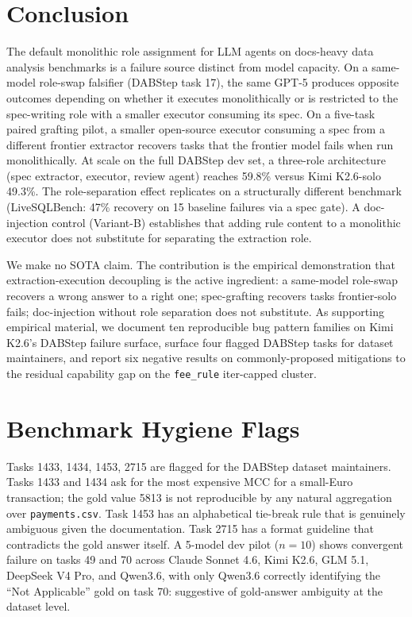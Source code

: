 \documentclass[conference]{IEEEtran}
\newcommand{\Kimi}{Kimi K2.6}
\newcommand{\DeepSeek}{DeepSeek V4 Pro}
\newcommand{\Sonnet}{Claude Sonnet 4.6}
\begin{document}
\section{Conclusion}
\label{sec:conclusion}

The default monolithic role assignment for LLM agents on docs-heavy data analysis benchmarks is a failure source distinct from model capacity. On a same-model role-swap falsifier (DABStep task 17), the same GPT-5 produces opposite outcomes depending on whether it executes monolithically or is restricted to the spec-writing role with a smaller executor consuming its spec. On a five-task paired grafting pilot, a smaller open-source executor consuming a spec from a different frontier extractor recovers tasks that the frontier model fails when run monolithically. At scale on the full DABStep dev set, a three-role architecture (spec extractor, executor, review agent) reaches 59.8\% versus \Kimi{}-solo 49.3\%. The role-separation effect replicates on a structurally different benchmark (LiveSQLBench: 47\% recovery on 15 baseline failures via a spec gate). A doc-injection control (Variant-B) establishes that adding rule content to a monolithic executor does not substitute for separating the extraction role.

We make no SOTA claim. The contribution is the empirical demonstration that extraction-execution decoupling is the active ingredient: a same-model role-swap recovers a wrong answer to a right one; spec-grafting recovers tasks frontier-solo fails; doc-injection without role separation does not substitute. As supporting empirical material, we document ten reproducible bug pattern families on \Kimi{}'s DABStep failure surface, surface four flagged DABStep tasks for dataset maintainers, and report six negative results on commonly-proposed mitigations to the residual capability gap on the \texttt{fee\_rule} iter-capped cluster.

\balance



\appendices

\section{Benchmark Hygiene Flags}
\label{app:benchmark_errors}
Tasks 1433, 1434, 1453, 2715 are flagged for the DABStep dataset maintainers. Tasks 1433 and 1434 ask for the most expensive MCC for a small-Euro transaction; the gold value 5813 is not reproducible by any natural aggregation over \texttt{payments.csv}. Task 1453 has an alphabetical tie-break rule that is genuinely ambiguous given the documentation. Task 2715 has a format guideline that contradicts the gold answer itself. A 5-model dev pilot ($n=10$) shows convergent failure on tasks 49 and 70 across \Sonnet{}, \Kimi{}, GLM 5.1, \DeepSeek{}, and Qwen3.6, with only Qwen3.6 correctly identifying the ``Not Applicable'' gold on task 70: suggestive of gold-answer ambiguity at the dataset level.
\end{document}
